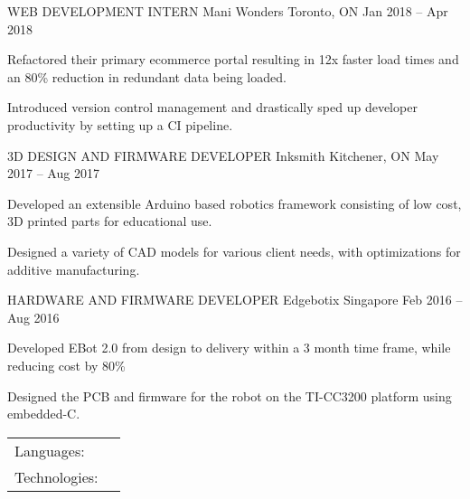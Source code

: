 \documentclass[]{awesome-cv}
\begin{document}
\begin{cventries}
{\begin{cvitems}
		\end{cvitems}}
	\cventry
	{WEB DEVELOPMENT INTERN}
	{Mani Wonders}
	{Toronto, ON}
	{Jan 2018 – Apr 2018}
	{\begin{cvitems}
		\item {Refactored their primary ecommerce portal resulting in 12x faster load times and an 80\% reduction in redundant data being loaded.}
		\item {Introduced version control management and drastically sped up developer productivity by setting up a CI pipeline.}
		\end{cvitems}}
	\cventry
	{3D DESIGN AND FIRMWARE DEVELOPER}
	{Inksmith}
	{Kitchener, ON}
	{May 2017 – Aug 2017}
	{\begin{cvitems}
		\item {Developed an extensible Arduino based robotics framework consisting of low cost, 3D printed parts for educational use.}
		\item {Designed a variety of CAD models for various client needs, with optimizations for additive manufacturing.}
		\end{cvitems}}
	\cventry
	{HARDWARE AND FIRMWARE DEVELOPER}
	{Edgebotix}
	{Singapore}
	{Feb 2016 – Aug 2016}
	{\begin{cvitems}
		\item {Developed EBot 2.0 from design to delivery within a 3 month time frame, while reducing cost by 80\%}
		\item {Designed the PCB and firmware for the robot on the TI-CC3200 platform using embedded-C.}
		\end{cvitems}}
\end{cventries}
\begin{cventries}
	\cventry
	{}
	{\def\arraystretch{1.15}{\begin{tabular}{ l l }
		Languages:  & {\skill{ C++, Python, Java, Javascript ES6, Golang, PHP, Lisp, Bash, C}} \\
		Technologies:  & {\skill{ React, Node, Docker, MongoDB, Postgres, CircleCI, TensorRT, Redis, gRPC/Protobuf, Meteor, AWS, Enzyme}} \\
		\end{tabular}}}
	{}
	{}
	{}
\end{cventries}

\vspace{-7mm}


\ 
\end{document}
